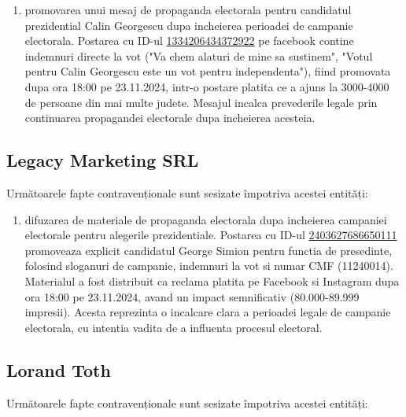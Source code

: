 \documentclass[a4paper,12pt]{article}
\begin{document}
\begin{enumerate}[leftmargin=*, label=\arabic*.)]
    \item promovarea unui mesaj de propaganda electorala pentru candidatul prezidential Calin Georgescu dupa incheierea perioadei de campanie electorala. Postarea cu ID-ul \href{https://www.facebook.com/ads/library/?id=1334206434372922}{1334206434372922} pe facebook contine indemnuri directe la vot ("Va chem alaturi de mine sa sustinem", "Votul pentru Calin Georgescu este un vot pentru independenta"), fiind promovata dupa ora 18:00 pe 23.11.2024, intr-o postare platita ce a ajuns la 3000-4000 de persoane din mai multe judete. Mesajul incalca prevederile legale prin continuarea propagandei electorale dupa incheierea acesteia.
\end{enumerate}

\vspace{0.5cm}

\subsection{Legacy Marketing SRL}
Următoarele fapte contravenționale sunt sesizate împotriva acestei entități:

\begin{enumerate}[leftmargin=*, label=\arabic*.)]
    \item difuzarea de materiale de propaganda electorala dupa incheierea campaniei electorale pentru alegerile prezidentiale. Postarea cu ID-ul \href{https://www.facebook.com/ads/library/?id=2403627686650111}{2403627686650111} promoveaza explicit candidatul George Simion pentru functia de presedinte, folosind sloganuri de campanie, indemnuri la vot si numar CMF (11240014). Materialul a fost distribuit ca reclama platita pe Facebook si Instagram dupa ora 18:00 pe 23.11.2024, avand un impact semnificativ (80.000-89.999 impresii). Acesta reprezinta o incalcare clara a perioadei legale de campanie electorala, cu intentia vadita de a influenta procesul electoral.
\end{enumerate}

\vspace{0.5cm}

\subsection{Lorand Toth}
Următoarele fapte contravenționale sunt sesizate împotriva acestei entități:
\end{document}
